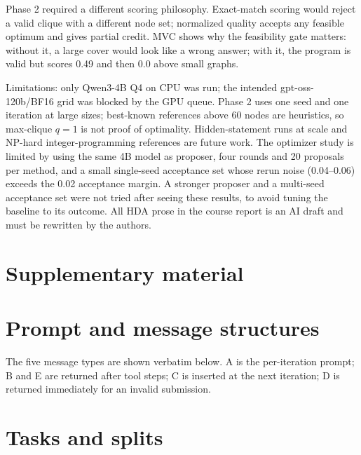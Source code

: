 \documentclass[10pt]{article}
\begin{document}
Phase 2 required a different scoring philosophy. Exact-match scoring would
reject a valid clique with a different node set; normalized quality accepts any
feasible optimum and gives partial credit. MVC shows why the feasibility gate
matters: without it, a large cover would look like a wrong answer; with it, the
program is valid but scores 0.49 and then 0.0 above small graphs.

Limitations: only Qwen3-4B Q4 on CPU was run; the intended gpt-oss-120b/BF16
grid was blocked by the GPU queue. Phase 2 uses one seed and one iteration at
large sizes; best-known references above 60 nodes are heuristics, so
max-clique $q=1$ is not proof of optimality. Hidden-statement runs at scale and
NP-hard integer-programming references are future work.
The optimizer study is limited by using the same 4B model as proposer, four
rounds and 20 proposals per method, and a small single-seed acceptance set
whose rerun noise (0.04--0.06) exceeds the 0.02 acceptance margin. A stronger
proposer and a multi-seed acceptance set were not tried after seeing these
results, to avoid tuning the baseline to its outcome.
All HDA prose in the
course report is an AI draft and must be rewritten by the authors.

\section*{Supplementary material}
\appendix
\section{Prompt and message structures}
The five message types are shown verbatim below. A is the per-iteration prompt;
B and E are returned after tool steps; C is inserted at the next iteration; D
is returned immediately for an invalid submission.







\section{Tasks and splits}
\begin{table}[H]
\centering
\small

\caption{Phase-1 tasks.}
\end{table}
\end{document}
